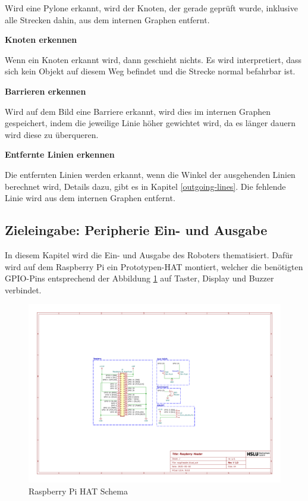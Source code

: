 Wird eine Pylone erkannt, wird der Knoten, der gerade geprüft wurde, inklusive alle Strecken dahin, aus dem internen Graphen entfernt.

\textbf{Knoten erkennen}

Wenn ein Knoten erkannt wird, dann geschieht nichts. Es wird interpretiert, dass sich kein Objekt auf diesem Weg befindet und die Strecke normal befahrbar ist.

\textbf{Barrieren erkennen}

Wird auf dem Bild eine Barriere erkannt, wird dies im internen Graphen gespeichert, indem die jeweilige Linie höher gewichtet wird, da es länger dauern wird diese zu überqueren.

\textbf{Entfernte Linien erkennen}

Die entfernten Linien werden erkannt, wenn die Winkel der ausgehenden Linien berechnet wird, Details dazu, gibt es in Kapitel \ref{outgoing-lines}. Die fehlende Linie wird aus dem internen Graphen entfernt.

\newpage
\subsection{Zieleingabe: Peripherie Ein- und Ausgabe}

In diesem Kapitel wird die Ein- und Ausgabe des Roboters thematisiert.
Dafür wird auf dem Raspberry Pi ein Prototypen-HAT montiert, welcher die benötigten GPIO-Pins entsprechend der Abbildung \ref{fig:raspiheader-schema} auf Taster, Display und Buzzer verbindet.

\begin{figure}[H]
    \centering
    \includegraphics[width=\linewidth, trim=7.5cm 6cm 10cm 6cm, clip]{assets/ET/PCB/raspiheader.pdf}
    \caption{Raspberry Pi HAT Schema}
    \label{fig:raspiheader-schema}
\end{figure}

